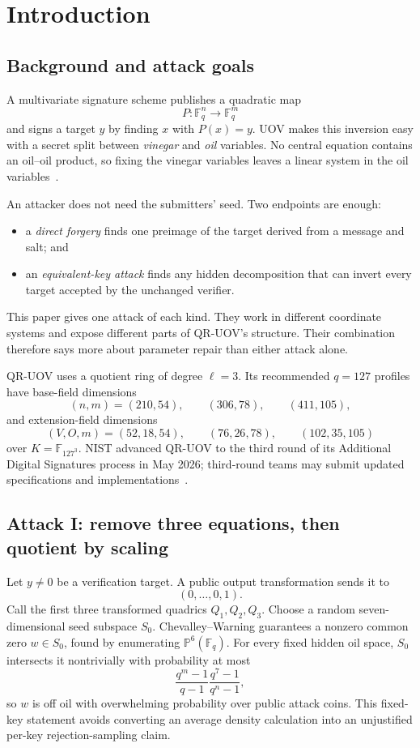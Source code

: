 \documentclass[11pt,a4paper]{article}
\theoremstyle{definition}
\theoremstyle{remark}
\newcommand{\F}{\mathbb F}
\newcommand{\PP}{\mathbb P}
\begin{document}
\section{Introduction}\label{sec:intro}

\subsection*{Background and attack goals}
A multivariate signature scheme publishes a quadratic map
\[
 P:\F_q^n\longrightarrow\F_q^m
\]
and signs a target $y$ by finding $x$ with $P(x)=y$.  UOV makes this inversion
easy with a secret split between \emph{vinegar} and \emph{oil} variables.  No
central equation contains an oil--oil product, so fixing the vinegar variables
leaves a linear system in the oil variables~\cite{KPG1999}.

An attacker does not need the submitters' seed.  Two endpoints are enough:
\begin{itemize}
\item a \emph{direct forgery} finds one preimage of the target derived from a
message and salt; and
\item an \emph{equivalent-key attack} finds any hidden decomposition that can
invert every target accepted by the unchanged verifier.
\end{itemize}
This paper gives one attack of each kind.  They work in different coordinate
systems and expose different parts of QR-UOV's structure.  Their combination
therefore says more about parameter repair than either attack alone.

QR-UOV uses a quotient ring of degree $\ell=3$.  Its recommended
$q=127$ profiles have base-field dimensions
\[
 (n,m)=(210,54),\qquad(306,78),\qquad(411,105),
\]
and extension-field dimensions
\[
 (V,O,m)=(52,18,54),\qquad(76,26,78),\qquad(102,35,105)
\]
over $K=\F_{127^3}$.  NIST advanced QR-UOV to the third round of its
Additional Digital Signatures process in May 2026; third-round teams may submit
updated specifications and implementations~\cite{NISTRound3,NISTIR8610}.

\subsection*{Attack I: remove three equations, then quotient by scaling}
Let $y\ne0$ be a verification target.  A public output transformation sends it
to
\[
 (0,\ldots,0,1).
\]
Call the first three transformed quadrics $Q_1,Q_2,Q_3$.  Choose a random
seven-dimensional seed subspace $S_0$.  Chevalley--Warning guarantees a
nonzero common zero $w\in S_0$, found by enumerating $\PP^6(\F_q)$.  For every
fixed hidden oil space, $S_0$ intersects it nontrivially with probability at
most
\[
 \frac{q^m-1}{q-1}\frac{q^7-1}{q^n-1},
\]
so $w$ is off oil with overwhelming probability over public attack coins.
This fixed-key statement avoids converting an average density calculation into
an unjustified per-key rejection-sampling claim.
\end{document}
